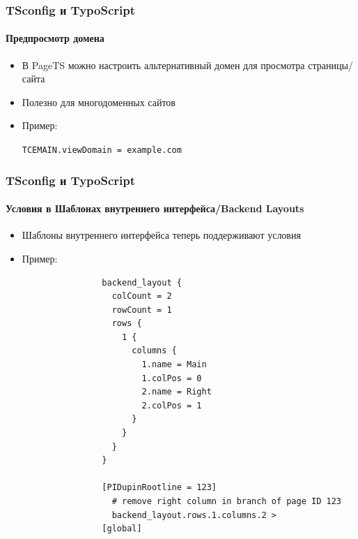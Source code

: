 
\begin{frame}[fragile]
	\frametitle{TSconfig и TypoScript}
	\framesubtitle{Предпросмотр домена}

	\begin{itemize}

		\item В PageTS можно настроить альтернативный домен для просмотра страницы/сайта
		\item Полезно для многодоменных сайтов
		\item Пример:

			\lstinline!TCEMAIN.viewDomain = example.com!

	\end{itemize}

\end{frame}


\begin{frame}[fragile]
	\frametitle{TSconfig и TypoScript}
	\framesubtitle{Условия в Шаблонах внутреннего интерфейса/Backend Layouts}

	\begin{itemize}

		\item Шаблоны внутреннего интерфейса теперь поддерживают условия
		\item Пример:

			\lstset{
				basicstyle=\tiny\ttfamily
			}

			\begin{lstlisting}
				backend_layout {
				  colCount = 2
				  rowCount = 1
				  rows {
				    1 {
				      columns {
				        1.name = Main
				        1.colPos = 0
				        2.name = Right
				        2.colPos = 1
				      }
				    }
				  }
				}

				[PIDupinRootline = 123]
				  # remove right column in branch of page ID 123
				  backend_layout.rows.1.columns.2 >
				[global]
			\end{lstlisting}

	\end{itemize}

\end{frame}


